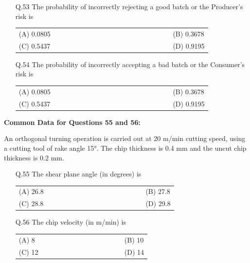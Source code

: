 \documentclass[a4paper,12pt]{article}
\begin{document}
\begin{enumerate}[label=Q.\arabic*), leftmargin=*]
\setcounter{enumi}{52}

\item[Q.53] The probability of incorrectly rejecting a good batch or the Producer's risk is
\begin{multicols}{2}
\begin{tabular}[t]{p{0.8\linewidth} p{0.9\linewidth}}
(A) 0.0805 & (B) 0.3678 \\
(C) 0.5437 & (D) 0.9195 \\
\end{tabular}
\end{multicols}

\item[Q.54] The probability of incorrectly accepting a bad batch or the Consumer's risk is
\begin{multicols}{2}
\begin{tabular}[t]{p{0.8\linewidth} p{0.9\linewidth}}
(A) 0.0805 & (B) 0.3678 \\
(C) 0.5437 & (D) 0.9195 \\
\end{tabular}
\end{multicols}
\end{enumerate}

\textbf{Common Data for Questions 55 and 56:}

An orthogonal turning operation is carried out at 20 m/min cutting speed, using a cutting tool of rake angle 15°. The chip thickness is 0.4 mm and the uncut chip thickness is 0.2 mm.

\begin{enumerate}[label=Q.\arabic*, leftmargin=*]
\setcounter{enumi}{54}

\item[Q.55] The shear plane angle (in degrees) is
\begin{multicols}{2}
\begin{tabular}[t]{p{0.8\linewidth} p{0.9\linewidth}}
(A) 26.8 & (B) 27.8 \\
(C) 28.8 & (D) 29.8 \\
\end{tabular}
\end{multicols}

\item[Q.56] The chip velocity (in m/min) is
\begin{multicols}{2}
\begin{tabular}[t]{p{0.8\linewidth} p{0.9\linewidth}}
(A) 8 & (B) 10 \\
(C) 12 & (D) 14 \\
\end{tabular}
\end{multicols}
\end{enumerate}
\end{document}

